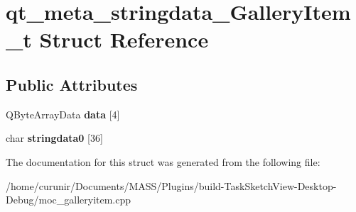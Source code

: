 \hypertarget{structqt__meta__stringdata___gallery_item__t}{}\section{qt\+\_\+meta\+\_\+stringdata\+\_\+\+Gallery\+Item\+\_\+t Struct Reference}
\label{structqt__meta__stringdata___gallery_item__t}
\subsection*{Public Attributes}
\begin{DoxyCompactItemize}
\item 
Q\+Byte\+Array\+Data {\bfseries data} \mbox{[}4\mbox{]}\hypertarget{structqt__meta__stringdata___gallery_item__t_aa7ac18f40b3e3a29d69d4c41359fc886}{}\label{structqt__meta__stringdata___gallery_item__t_aa7ac18f40b3e3a29d69d4c41359fc886}

\item 
char {\bfseries stringdata0} \mbox{[}36\mbox{]}\hypertarget{structqt__meta__stringdata___gallery_item__t_ab1540d7608cb990dbd0fbd25dc86a19c}{}\label{structqt__meta__stringdata___gallery_item__t_ab1540d7608cb990dbd0fbd25dc86a19c}

\end{DoxyCompactItemize}


The documentation for this struct was generated from the following file\+:\begin{DoxyCompactItemize}
\item 
/home/curunir/\+Documents/\+M\+A\+S\+S/\+Plugins/build-\/\+Task\+Sketch\+View-\/\+Desktop-\/\+Debug/moc\+\_\+galleryitem.\+cpp\end{DoxyCompactItemize}
